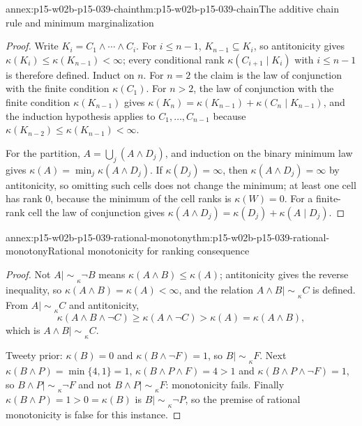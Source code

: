 \begin{annexitem}{annex:p15-w02b-p15-039-chain}{thm:p15-w02b-p15-039-chain}{The additive chain rule and minimum marginalization}
\begin{proof}
Write \(K_i=C_1\land\cdots\land C_i\).  For \(i\leq n-1\),
\(K_{n-1}\subseteq K_i\), so antitonicity gives
\(\kappa(K_i)\leq\kappa(K_{n-1})<\infty\); every conditional rank
\(\kappa(C_{i+1}\mid K_i)\) with \(i\leq n-1\) is therefore defined.
Induct on \(n\).  For \(n=2\) the claim is the law of conjunction with the
finite condition \(\kappa(C_1)\).  For \(n>2\), the law of conjunction with
the finite condition \(\kappa(K_{n-1})\) gives
\(\kappa(K_n)=\kappa(K_{n-1})+\kappa(C_n\mid K_{n-1})\), and the induction
hypothesis applies to \(C_1,\ldots,C_{n-1}\) because
\(\kappa(K_{n-2})\leq\kappa(K_{n-1})<\infty\).

For the partition, \(A=\bigcup_j(A\land D_j)\), and induction on the binary
minimum law gives \(\kappa(A)=\min_j\kappa(A\land D_j)\).  If
\(\kappa(D_j)=\infty\), then \(\kappa(A\land D_j)=\infty\) by
antitonicity, so omitting such cells does not change the minimum; at least
one cell has rank \(0\), because the minimum of the cell ranks is
\(\kappa(W)=0\).  For a finite-rank cell the law of conjunction gives
\(\kappa(A\land D_j)=\kappa(D_j)+\kappa(A\mid D_j)\).
\end{proof}
\end{annexitem}

\begin{annexitem}{annex:p15-w02b-p15-039-rational-monotony}{thm:p15-w02b-p15-039-rational-monotony}{Rational monotonicity for ranking consequence}
\begin{proof}
Not \(A\mathrel{|\!\sim}_\kappa\neg B\) means
\(\kappa(A\land B)\leq\kappa(A)\); antitonicity gives the reverse
inequality, so \(\kappa(A\land B)=\kappa(A)<\infty\), and the relation
\(A\land B\mathrel{|\!\sim}_\kappa C\) is defined.  From
\(A\mathrel{|\!\sim}_\kappa C\) and antitonicity,
\[
 \kappa(A\land B\land\neg C)\geq\kappa(A\land\neg C)>\kappa(A)
 =\kappa(A\land B),
\]
which is \(A\land B\mathrel{|\!\sim}_\kappa C\).

Tweety prior: \(\kappa(B)=0\) and \(\kappa(B\land\neg F)=1\), so
\(B\mathrel{|\!\sim}_\kappa F\).  Next \(\kappa(B\land P)=\min\{4,1\}=1\),
\(\kappa(B\land P\land F)=4>1\) and \(\kappa(B\land P\land\neg F)=1\),
so \(B\land P\mathrel{|\!\sim}_\kappa\neg F\) and not
\(B\land P\mathrel{|\!\sim}_\kappa F\): monotonicity fails.  Finally
\(\kappa(B\land P)=1>0=\kappa(B)\) is \(B\mathrel{|\!\sim}_\kappa\neg P\),
so the premise of rational monotonicity is false for this instance.
\end{proof}
\end{annexitem}
